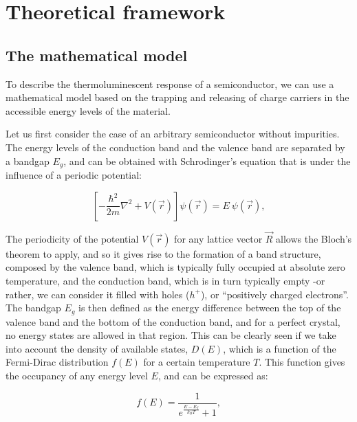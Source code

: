 \chapter{Theoretical framework}\label{ch:3}


\section{The mathematical model} \label{sec:modelo}

To describe the thermoluminescent response of a semiconductor, we can use a mathematical model based on the trapping and releasing of charge carriers in the accessible energy levels of the material. 

\vspace{10pt}

Let us first consider the case of an arbitrary semiconductor without impurities. The energy levels of the conduction band and the valence band are separated by a bandgap $E_g$, and can be obtained with Schrodinger's equation that is under the influence of a periodic potential:

\begin{equation} \label{eq:schrodinger}
  \left[ -\frac{\hbar^2}{2m} \nabla^2 + V(\vec{r}) \right] \psi(\vec{r}) = E ~ \psi(\vec{r}),
\end{equation}

\vspace{10pt}
The periodicity of the potential $V(\vec{r})$ for any lattice vector $\vec{R}$ allows the Bloch's theorem to apply, and so it gives rise to the formation of a band structure, composed by the valence band, which is typically fully occupied at absolute zero temperature, and the conduction band, which is in turn typically empty -or rather, we can consider it filled with holes ($h^+$), or ``positively charged electrons''. The bandgap $E_g$ is then defined as the energy difference between the top of the valence band and the bottom of the conduction band, and for a perfect crystal, no energy states are allowed in that region. This can be clearly seen if we take into account the density of available states, $D(E)$, which is a function of the Fermi-Dirac distribution $f(E)$ for a certain temperature $T$. This function gives the occupancy of any energy level $E$, and can be expressed as:

\begin{equation} \label{eq:fermidirac}
  f(E) = \frac{1}{e^{\frac{E - E_f}{k_B T}} + 1},
\end{equation}

